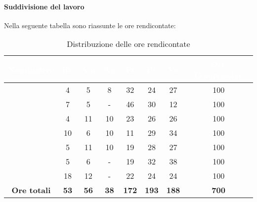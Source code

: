 \paragraph{Suddivisione del lavoro}
Nella seguente tabella sono riassunte le ore rendicontate:
\begin{table}[H]
	\begin{center}
		\begin{tabular}{ |c c c c c c c c| }
		\rowcolor{darkblue} 
		\textcolor{white}{\textbf{Nominativo}} & \textcolor{white}{\textbf{Re}} & \textcolor{white}{\textbf{Am}} & \textcolor{white}{\textbf{An}} & \textcolor{white}{\textbf{Pt}} & \textcolor{white}{\textbf{Pr}} & \textcolor{white}{\textbf{Ve}} & \textcolor{white}{\textbf{Ore Complessive}} \\ \hline
		\BL 	& 4  	& 5  	& 8 	& 32 	& 24 	& 27 	& 100 \\ \hline
		\FF 	& 7 	& 5 	& -	& 46 	& 30 	& 12 	& 100 \\ \hline
		\MM 	& 4  	& 11  	& 10 	& 23 	& 26 	& 26  	& 100 \\ \hline
		\PC 	& 10 	& 6  	& 10	& 11 	& 29	& 34 	& 100 \\ \hline
		\TG 	& 5  	& 11 	& 10 	& 19 	& 28 	& 27 	& 100 \\ \hline
		\TL 	& 5  	& 6 	& - 	& 19 	& 32 	& 38 	& 100 \\ \hline
		\VD 	& 18  	& 12  	& -	& 22 	& 24 	& 24 	& 100 \\ \hline
		\textbf{Ore totali} & \textbf{53} & \textbf{56} & \textbf{38} & \textbf{172} & \textbf{193} & \textbf{188} & \textbf{700} \\ \hline
		\end{tabular}
	\caption{Distribuzione delle ore rendicontate}
	\end{center}
\end{table}
